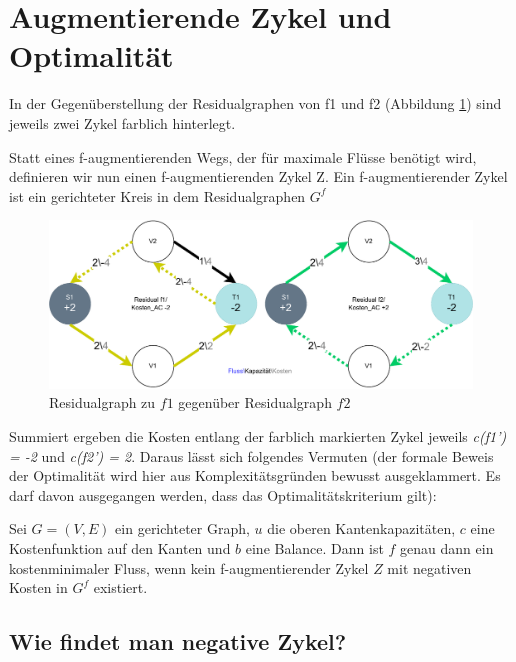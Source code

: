 \section{Augmentierende Zykel und Optimalität}

In der Gegenüberstellung der Residualgraphen von f1 und f2 (Abbildung \ref{fig:resi_f1_vs_f2}) sind jeweils zwei Zykel farblich hinterlegt.
\begin{definition}
Statt eines f-augmentierenden Wegs, der für maximale Flüsse benötigt wird, definieren wir nun einen f-augmentierenden Zykel Z. Ein f-augmentierender Zykel ist ein gerichteter Kreis in dem Residualgraphen $G^f$
\label{def:augmented_cycle}
\end{definition}
\begin{figure}[htb]
\centering
\includegraphics[width=1.0\textwidth]{img/steffen/resi_f1_vs_f2.drawio.pdf}
\caption{Residualgraph zu $f1$ gegenüber Residualgraph $f2$}
\label{fig:resi_f1_vs_f2}
\end{figure}
Summiert ergeben die Kosten entlang der farblich markierten Zykel jeweils \textit{c(f1') = -2} und \textit{c(f2') = 2}. Daraus lässt sich folgendes Vermuten (der formale Beweis der Optimalität wird hier aus Komplexitätsgründen bewusst ausgeklammert. Es darf davon ausgegangen werden, dass das Optimalitätskriterium gilt):

\begin{definition}
    Sei $G = (V, E)$ ein gerichteter Graph, $u$ die oberen Kantenkapazitäten, $c$ eine Kostenfunktion auf den Kanten und $b$ eine Balance. Dann ist $f$ genau dann ein kostenminimaler Fluss, wenn kein f-augmentierender Zykel $Z$ mit negativen Kosten in $G^f$ existiert.
\end{definition}

\subsection{Wie findet man negative Zykel?}

